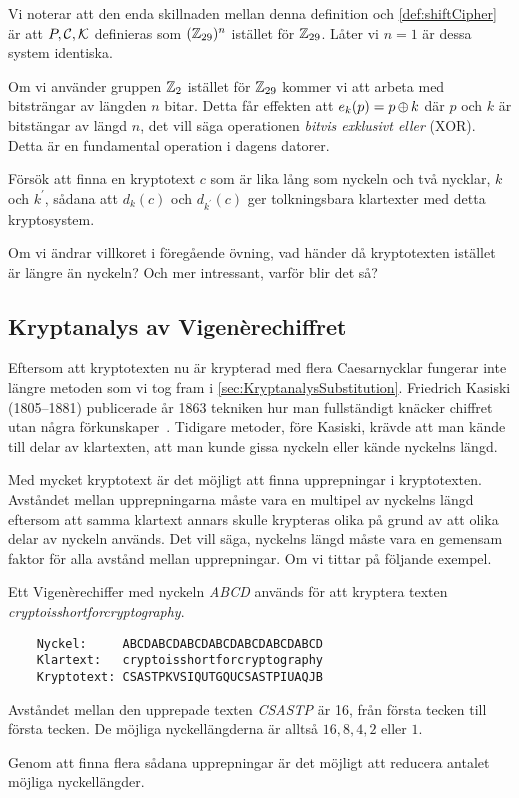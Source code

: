 Vi noterar att den enda skillnaden mellan denna definition och 
\cref{def:shiftCipher} är att \(\P, \C, \K\) definieras som 
\((\mathbb{Z}_{29})^n\) istället för \(\mathbb{Z}_{29}\).
Låter vi \(n = 1\) är dessa system identiska.

Om vi använder gruppen \(\mathbb{Z}_2\) istället för \(\mathbb{Z}_{29}\) kommer vi att arbeta 
med bitsträngar av längden \(n\) bitar.
Detta får effekten att \(e_k(p) = p \operatorname{\oplus} k\) där \(p\) och \(k\) är bitstängar 
av längd \(n\), det vill säga operationen \emph{bitvis exklusivt eller} (XOR).
Detta är en fundamental operation i dagens datorer.

\begin{exercise}
  Försök att finna en kryptotext \(c\) som är lika lång som nyckeln och två 
  nycklar, \(k\) och \(k^\prime\), sådana att \(d_k(c)\) och 
  \(d_{k^\prime}(c)\) ger tolkningsbara klartexter med detta kryptosystem.
\end{exercise}
\begin{exercise}
  Om vi ändrar villkoret i föregående övning, vad händer då kryptotexten 
  istället är längre än nyckeln?
  Och mer intressant, varför blir det så?
\end{exercise}

\subsection{Kryptanalys av Vigenèrechiffret}
Eftersom att kryptotexten nu är krypterad med flera Caesarnycklar fungerar inte 
längre metoden som vi tog fram i \cref{sec:KryptanalysSubstitution}.
Friedrich Kasiski (1805--1881) publicerade år 1863 tekniken hur man 
fullständigt knäcker chiffret utan några förkunskaper~\cite{Stinson2006cta}.
Tidigare metoder, före Kasiski, krävde att man kände till delar av klartexten,
att man kunde gissa nyckeln eller kände nyckelns längd.

Med mycket kryptotext är det möjligt att finna upprepningar i kryptotexten.
Avståndet mellan upprepningarna måste vara en multipel av nyckelns längd 
eftersom att samma klartext annars skulle krypteras olika på grund av att olika 
delar av nyckeln används.
Det vill säga, nyckelns längd måste vara en gemensam faktor för alla avstånd 
mellan upprepningar.
Om vi tittar på följande exempel.
\begin{example}\label{ex:VigenereMedUpprepning}
  Ett Vigenèrechiffer med nyckeln \emph{ABCD} används för att kryptera texten 
  \emph{cryptoisshortforcryptography}.
  \begin{verbatim}
    Nyckel:     ABCDABCDABCDABCDABCDABCDABCD
    Klartext:   cryptoisshortforcryptography
    Kryptotext: CSASTPKVSIQUTGQUCSASTPIUAQJB
  \end{verbatim}
  Avståndet mellan den upprepade texten \emph{CSASTP} är 16, från första 
  tecken till första tecken.
  De möjliga nyckellängderna är alltså \(16, 8, 4, 2\) eller \(1\).
\end{example}
Genom att finna flera sådana upprepningar är det möjligt att reducera antalet 
möjliga nyckellängder.

